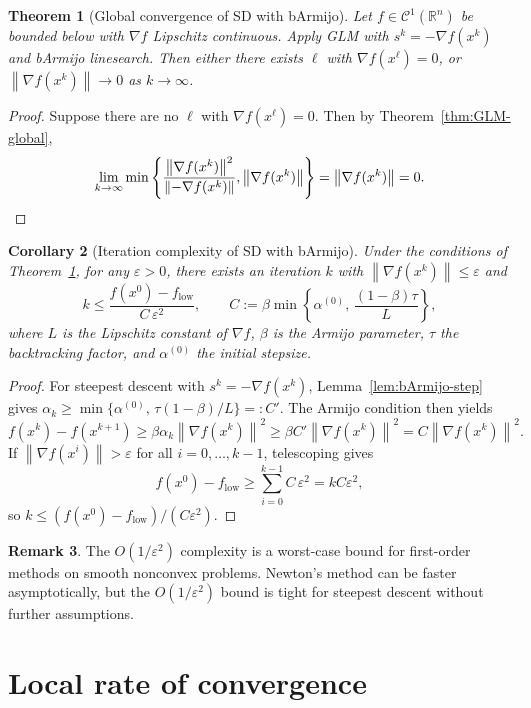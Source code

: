 \documentclass[11pt,a4paper]{report}
\theoremstyle{plain}
\newtheorem{theorem}{Theorem}[chapter]
\newtheorem{corollary}[theorem]{Corollary}
\theoremstyle{definition}
\newtheorem{remark}[theorem]{Remark}
\newcommand{\R}{\mathbb{R}}
\newcommand{\norm}[1]{\left\lVert#1\right\rVert}
\newcommand{\grad}{\nabla}
\newcommand{\eps}{\varepsilon}
\begin{document}
\begin{theorem}[Global convergence of SD with bArmijo]\label{thm:SD-global}
Let $f\in\mathcal{C}^{1}(\R^{n})$ be bounded below with $\grad f$ Lipschitz
continuous. Apply GLM with $s^{k}=-\grad f(x^{k})$ and bArmijo linesearch.
Then either there exists $\ell$ with $\grad f(x^{\ell})=0$, or
$\norm{\grad f(x^{k})}\to 0$ as $k\to\infty$.
\end{theorem}
\begin{proof}
  Suppose there are no $\ell$ with $\grad f(x^{\ell}) = 0$. Then by Theorem~\ref{thm:GLM-global}, 
  \[
  \lim_{k\to\infty}\min \left\{\frac{\norm{\grad f(x^{k})}^2}{\norm{-\grad f(x^{k})}}, \norm{\grad f(x^{k})}\right\} = \norm{\grad f(x^{k})} = 0. \qedhere
  \]
\end{proof}

\begin{corollary}[Iteration complexity of SD with bArmijo]\label{cor:SD-complexity}
Under the conditions of Theorem~\ref{thm:SD-global}, for any $\eps>0$, there exists
an iteration $k$ with $\norm{\grad f(x^{k})}\le\eps$ and
\[
k\le\frac{f(x^{0})-f_{\mathrm{low}}}{C\,\eps^{2}},
\qquad
C:=\beta\min\!\left\{\alpha^{(0)},\,
\frac{(1-\beta)\tau}{L}\right\},
\]
where $L$ is the Lipschitz constant of $\grad f$, $\beta$ is the Armijo parameter, $\tau$ the backtracking factor, and $\alpha^{(0)}$ the initial stepsize.
\end{corollary}
\begin{proof}
For steepest descent with $s^{k}=-\grad f(x^{k})$, Lemma~\ref{lem:bArmijo-step} gives
$\alpha_{k}\ge\min\{\alpha^{(0)},\,\tau(1-\beta)/L\}=:C'$.
The Armijo condition then yields
\[
f(x^{k})-f(x^{k+1})\ge\beta\alpha_{k}\norm{\grad f(x^{k})}^{2}
\ge \beta C'\norm{\grad f(x^{k})}^{2}
=C\norm{\grad f(x^{k})}^{2}.
\]
If $\norm{\grad f(x^{i})}>\eps$ for all $i=0,\dots,k-1$, telescoping gives
\[
f(x^{0})-f_{\mathrm{low}}\ge\sum_{i=0}^{k-1}C\,\eps^{2}=kC\eps^{2},
\]
so $k\le(f(x^{0})-f_{\mathrm{low}})/(C\eps^{2})$.
\end{proof}

\begin{remark}
The $O(1/\eps^{2})$ complexity is a worst-case bound for first-order methods on
smooth nonconvex problems. Newton's method can be faster asymptotically, but the
$O(1/\eps^{2})$ bound is tight for steepest descent without further assumptions.
\end{remark}

\section{Local rate of convergence}
\end{document}
